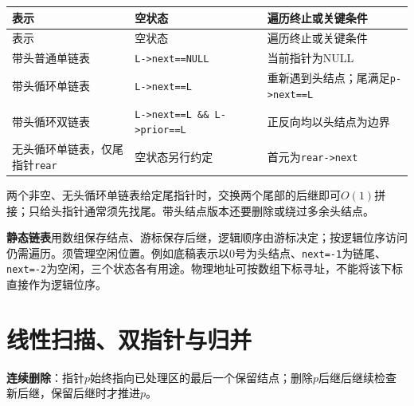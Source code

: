 \par\smallskip
\begin{wideblock}
{\fontsize{9.3}{12}\selectfont\setlength{\tabcolsep}{2.5pt}\setlength{\LTleft}{0pt}\setlength{\LTright}{0pt}
\begin{longtable}{@{}>{\raggedright\arraybackslash}p{}>{\raggedright\arraybackslash}p{}>{\raggedright\arraybackslash}p{}@{}}
\toprule
表示 & 空状态 & 遍历终止或关键条件 \\

\midrule\endfirsthead\toprule
表示 & 空状态 & 遍历终止或关键条件 \\

\midrule\endhead\bottomrule\endfoot
带头普通单链表 & \texttt{L-\textgreater{}next==NULL} & 当前指针为NULL \\

带头循环单链表 & \texttt{L-\textgreater{}next==L} & 重新遇到头结点；尾满足\texttt{p-\textgreater{}next==L} \\

带头循环双链表 & \texttt{L-\textgreater{}next==L\ \&\&\ L-\textgreater{}prior==L} & 正反向均以头结点为边界 \\

无头循环单链表，仅尾指针\texttt{rear} & 空状态另行约定 & 首元为\texttt{rear-\textgreater{}next} \\

\end{longtable}}
\end{wideblock}
\par\smallskip

两个非空、无头循环单链表给定尾指针时，交换两个尾部的后继即可\(O(1)\)拼接；只给头指针通常须先找尾。带头结点版本还要删除或绕过多余头结点。

\textbf{静态链表}用数组保存结点、游标保存后继，逻辑顺序由游标决定；按逻辑位序访问仍需遍历。须管理空闲位置。例如底稿表示以0号为头结点、\texttt{next=\allowbreak{}-1}为链尾、\texttt{next=\allowbreak{}-2}为空闲，三个状态各有用途。物理地址可按数组下标寻址，不能将该下标直接作为逻辑位序。

\section{线性扫描、双指针与归并}\label{DS02-methods}

\textbf{连续删除}：指针\(p\)始终指向已处理区的最后一个保留结点；删除\(p\)后继后继续检查新后继，保留后继时才推进\(p\)。

